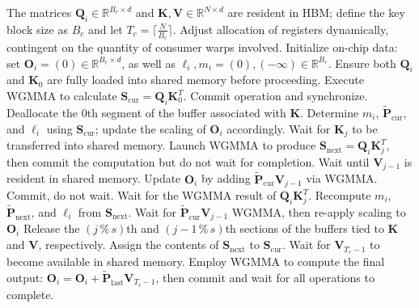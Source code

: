 \begin{enumerate}
\begin{algorithm}[H]
    \caption{\small\label{alg:flash3_wgmma}\textsc{FlashAttention-3} consumer warpgroup forward pass}
    \begin{algorithmic}[1]
      \REQUIRE  The matrices $\mathbf{Q}_i \in \mathbb{R}^{B_r \times d}$ and $\mathbf{K}, \mathbf{V} \in \mathbb{R}^{N \times d}$ are resident in HBM; define the key block size as $B_c$ and let $T_c = \lceil \frac{N}{B_c} \rceil$.
      \STATE Adjust allocation of registers dynamically, contingent on the quantity of consumer warps involved.
      \STATE Initialize on-chip data: set $\mathbf{O}_i = (0) \in \mathbb{R}^{B_r \times d}$, as well as $\ell_i, m_i = (0), (-\infty) \in \mathbb{R}^{B_r}$.
      \STATE Ensure both $\mathbf{Q}_i$ and $\mathbf{K}_0$ are fully loaded into shared memory before proceeding.
      \STATE Execute WGMMA to calculate $\mathbf{S}_{\mathrm{cur}} = \mathbf{Q}_i \mathbf{K}_0^T$. Commit operation and synchronize.
      \STATE Deallocate the $0$th segment of the buffer associated with $\mathbf{K}$.
      \STATE Determine $m_{i}$, $\tilde{\mathbf{P}}_{\mathrm{cur}}$, and $\ell_{i}$ using $\mathbf{S}_{\mathrm{cur}}$; update the scaling of $\mathbf{O}_i$ accordingly.
        \STATE Wait for $\mathbf{K}_j$ to be transferred into shared memory.
        \label{code:mainloop_start}
        \STATE Launch WGMMA to produce $\mathbf{S}_{\mathrm{next}} = \mathbf{Q}_i \mathbf{K}_{j}^T$, then commit the computation but do not wait for completion. \label{code:first_wgmma}
        \STATE Wait until $\mathbf{V}_{j-1}$ is resident in shared memory.
        \STATE Update $\mathbf{O}_{i}$ by adding $\tilde{\mathbf{P}}_{\mathrm{cur}} \mathbf{V}_{j-1}$ via WGMMA. Commit, do not wait. \label{code:second_wgmma}
        \STATE Wait for the WGMMA result of $\mathbf{Q}_i \mathbf{K}_{j}^T$.
        \STATE Recompute $m_{i}$, $\tilde{\mathbf{P}}_{\mathrm{next}}$, and $\ell_{i}$ from $\mathbf{S}_{\mathrm{next}}$. \label{code:softmax}
        \STATE Wait for $\tilde{\mathbf{P}}_{\mathrm{cur}} \mathbf{V}_{j-1}$ WGMMA, then re-apply scaling to $\mathbf{O}_i$
        \STATE Release the $(j\,\%\,s)$th and $(j-1\,\%\,s)$th sections of the buffers tied to $\mathbf{K}$ and $\mathbf{V}$, respectively.
        \STATE Assign the contents of $\mathbf{S}_{\mathrm{next}}$ to $\mathbf{S}_{\mathrm{cur}}$.
        \label{code:mainloop_end}
      \ENDFOR \STATE Wait for $\mathbf{V}_{T_c - 1}$ to become available in shared memory.
      \STATE Employ WGMMA to compute the final output: $\mathbf{O}_{i} = \mathbf{O}_{i} + \tilde{\mathbf{P}}_{\mathrm{last}} \mathbf{V}_{T_c - 1}$, then commit and wait for all operations to complete.


\end{algorithmic}
\end{algorithm}
\end{enumerate}
